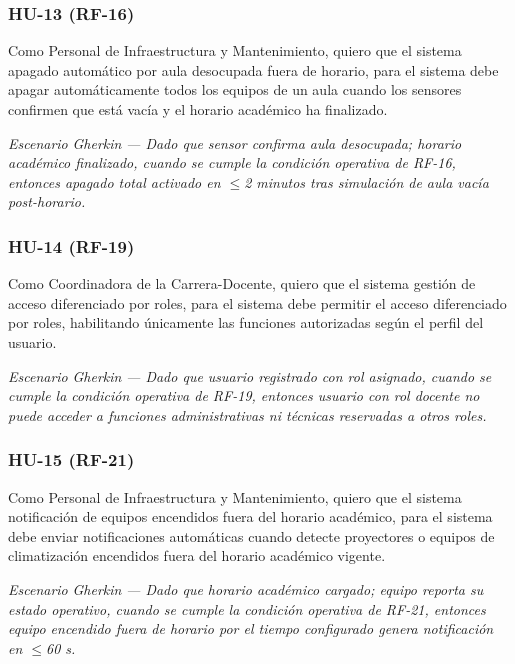 \subsubsection*{HU-13 (RF-16)}


Como Personal de Infraestructura y Mantenimiento, quiero que el sistema apagado automático por aula desocupada fuera de horario, para el sistema debe apagar automáticamente todos los equipos de un aula cuando los sensores confirmen que está vacía y el horario académico ha finalizado.


\textit{Escenario }\textit{Gherkin}\textit{ --- Dado que sensor confirma aula desocupada; horario académico finalizado, cuando se cumple la condición operativa de RF-16, entonces apagado total activado en $\leq$2 minutos tras simulación de aula vacía }\textit{post-horario}\textit{.}


\subsubsection*{HU-14 (RF-19)}


Como Coordinadora de la Carrera-Docente, quiero que el sistema gestión de acceso diferenciado por roles, para el sistema debe permitir el acceso diferenciado por roles, habilitando únicamente las funciones autorizadas según el perfil del usuario.


\textit{Escenario }\textit{Gherkin}\textit{ --- Dado que usuario registrado con rol asignado, cuando se cumple la condición operativa de RF-19, entonces usuario con rol docente no puede acceder a funciones administrativas ni técnicas reservadas a otros roles.}


\subsubsection*{HU-15 (RF-21)}


Como Personal de Infraestructura y Mantenimiento, quiero que el sistema notificación de equipos encendidos fuera del horario académico, para el sistema debe enviar notificaciones automáticas cuando detecte proyectores o equipos de climatización encendidos fuera del horario académico vigente.


\textit{Escenario }\textit{Gherkin}\textit{ --- Dado que horario académico cargado; equipo reporta su estado operativo, cuando se cumple la condición operativa de RF-21, entonces equipo encendido fuera de horario por el tiempo configurado genera notificación en $\leq$60 s.}


